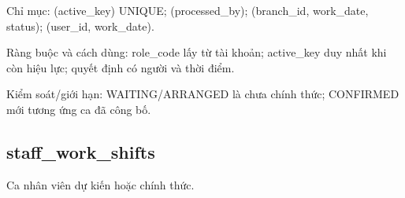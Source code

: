 Chỉ mục:\allowbreak{} (active\_\allowbreak{}key) UNIQUE; (processed\_\allowbreak{}by); (branch\_\allowbreak{}id, work\_\allowbreak{}date, status); (user\_\allowbreak{}id, work\_\allowbreak{}date).\allowbreak{}

Ràng buộc và cách dùng:\allowbreak{} role\_\allowbreak{}code lấy từ tài khoản; active\_\allowbreak{}key duy nhất khi còn hiệu lực; quyết định có người và thời điểm.\allowbreak{}

Kiểm soát/\allowbreak{}giới hạn:\allowbreak{} WAITING/\allowbreak{}ARRANGED là chưa chính thức; CONFIRMED mới tương ứng ca đã công bố.\allowbreak{}

\clearpage

\subsection{staff\_\allowbreak{}work\_\allowbreak{}shifts}
Ca nhân viên dự kiến hoặc chính thức.\allowbreak{}


